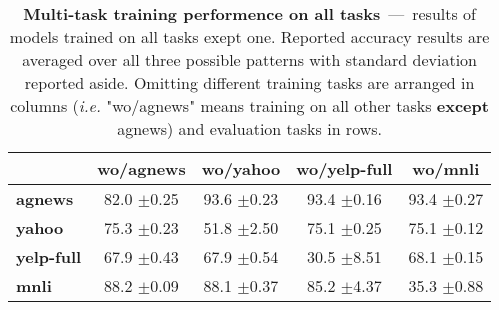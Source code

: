 \begin{table}[t]
	\fontsize{7}{10}
	\selectfont
	\begin{tabular}{lcccc}
		\toprule
		& \textbf{wo/agnews} & \textbf{wo/yahoo} & \textbf{wo/yelp-full} & \textbf{wo/mnli} \\
		\hline
		\textbf{agnews}    & 82.0 \tiny$\pm$0.25        & 93.6 \tiny$\pm$0.23        & 93.4   \tiny$\pm$0.16          & 93.4 \tiny$\pm$0.27       \\
		\textbf{yahoo}     & 75.3 \tiny$\pm$0.23        & 51.8 \tiny$\pm$2.50        & 75.1   \tiny$\pm$0.25          & 75.1 \tiny$\pm$0.12       \\
		\textbf{yelp-full} & 67.9 \tiny$\pm$0.43        & 67.9 \tiny$\pm$0.54        & 30.5   \tiny$\pm$8.51          & 68.1 \tiny$\pm$0.15       \\
		\textbf{mnli}      & 88.2 \tiny$\pm$0.09        & 88.1 \tiny$\pm$0.37        & 85.2   \tiny$\pm$4.37          & 35.3 \tiny$\pm$0.88      \\
		\bottomrule
	\end{tabular}
	\caption{\textbf{Multi-task training performence on all tasks}~---~results of models trained on all tasks exept one. Reported accuracy results are averaged over all three possible patterns with standard deviation reported aside. Omitting different training tasks are arranged in columns (\textit{i.e.} "wo/agnews" means training on all other tasks \textbf{except} agnews) and evaluation tasks in rows.}\label{tab:multi-on-train-set-summary}
\end{table}